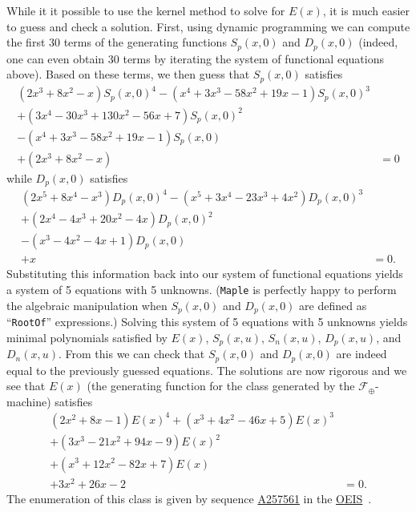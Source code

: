 \documentclass[10pt]{article}
\theoremstyle{plain}
\theoremstyle{definition}
\newcommand{\F}{\mathcal{F}}
\newcommand{\OEISlink}[1]{\href{http://oeis.org/#1}{#1}}
\newcommand{\OEISref}{\href{http://oeis.org/}{OEIS}~\cite{sloane:the-on-line-enc:}}
\newcommand{\OEIS}[1]{sequence \OEISlink{#1} in the \OEISref}
\begin{document}
While it it possible to use the kernel method to solve for $E(x)$, it is much easier to guess and check a solution. First, using dynamic programming we can compute the first $30$ terms of the generating functions $S_p(x,0)$ and $D_p(x,0)$ (indeed, one can even obtain $30$ terms by iterating the system of functional equations above). Based on these terms, we then guess that $S_p(x,0)$ satisfies
\begin{align*}
	(2x^3+8x^2-x)S_p(x,0)^4
	-(x^4+3x^3-58x^2+19x-1)S_p(x,0)^3\\
	+(3x^4-30x^3+130x^2-56x+7)S_p(x,0)^2\\
	-(x^4+3x^3-58x^2+19x-1)S_p(x,0)\\
	+(2x^3+8x^2-x)
	& = 0
\end{align*}
while $D_p(x,0)$ satisfies
\begin{align*}
	(2x^5+8x^4-x^3)D_p(x,0)^4
	-(x^5+3x^4-23x^3+4x^2)D_p(x,0)^3\\
	+(2x^4-4x^3+20x^2-4x)D_p(x,0)^2\\
	-(x^3-4x^2-4x+1)D_p(x,0)\\
	+x
	& = 0.
\end{align*}
Substituting this information back into our system of functional equations yields a system of 5 equations with 5 unknowns. (\texttt{Maple} is perfectly happy to perform the algebraic manipulation when $S_p(x,0)$ and $D_p(x,0)$ are defined as ``\texttt{RootOf}'' expressions.) Solving this system of 5 equations with 5 unknowns yields minimal polynomials satisfied by $E(x)$, $S_p(x,u)$, $S_n(x,u)$, $D_p(x,u)$, and $D_n(x,u)$. From this we can check that $S_p(x,0)$ and $D_p(x,0)$ are indeed equal to the previously guessed equations. The solutions are now rigorous and we see that $E(x)$ (the generating function for the class generated by the $\F_\oplus$-machine) satisfies
\begin{align*}
	(2x^2+8x-1)E(x)^4
	+(x^3+4x^2-46x+5)E(x)^3\\
	+(3x^3-21x^2+94x-9)E(x)^2\\
	+(x^3+12x^2-82x+7)E(x)\\
	+3x^2+26x-2
	& = 0.
\end{align*}
The enumeration of this class is given by \OEIS{A257561}.
\end{document}
